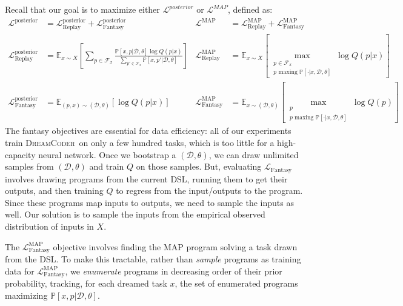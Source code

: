 \documentclass{article}
\newcommand{\system}{\textsc{DreamCoder}~}
\newcommand{\expect}{\mathds{E}} %
\newcommand{\probability}{\mathds{P}} %
\begin{document}
Recall that our goal is to maximize either $\mathcal{L}^{posterior}$ or $\mathcal{L}^{MAP}$, defined as:
\begin{align*}
  \mathcal{L}^{\text{posterior}} &= \mathcal{L}_{\text{Replay}}^{\text{posterior}} + \mathcal{L}_{\text{Fantasy}}^{\text{posterior}}&
  \mathcal{L}^{\text{MAP}} &= \mathcal{L}_{\text{Replay}}^{\text{MAP}} + \mathcal{L}_{\text{Fantasy}}^{\text{MAP}}\\
  \mathcal{L}_{\text{Replay}}^{\text{posterior}}& = \expect_{x\sim X}\left[\sum_{p\in \mathcal{F}_x}
    \frac{\probability\left[x,p|\mathcal{D},\theta \right]\log Q(p|x)}{\sum_{p'\in \mathcal{F}_x}\probability\left[x,p'|\mathcal{D},\theta \right]}\right] &
\mathcal{L}_{\text{Replay}}^{\text{MAP}}& = \expect_{x\sim X}\left[\max_{\substack{p\in \mathcal{F}_x\\p\text{ maxing }\probability[\cdot |x,\mathcal{D},\theta]}} \log Q(p|x) \right]  \\
  \mathcal{L}_{\text{Fantasy}}^{\text{posterior}} &= \expect_{(p,x)\sim(\mathcal{D},\theta) }\left[\log Q(p|x)\right]&
    \mathcal{L}_{\text{Fantasy}}^{\text{MAP}} &= \expect_{x\sim(\mathcal{D},\theta) }\left[\max_{\substack{p\\p\text{ maxing }\probability[\cdot |x,\mathcal{D},\theta]}}\log Q(p)\right]
\end{align*}
The fantasy objectives are essential for data efficiency:
all of our experiments train \system on only a few hundred tasks, which is too little for
a high-capacity neural network.
Once we bootstrap a $(\mathcal{D},\theta)$,
we can draw unlimited samples from $(\mathcal{D},\theta)$
and train $Q$ on those samples.
But, evaluating $\mathcal{L}_{\text{Fantasy}}$ involves drawing programs from
the current DSL, running them to get their outputs,
and then training $Q$ to regress from the input/outputs to the program.
Since these programs map inputs to outputs,
we need to sample the inputs as well.
Our solution is to sample the inputs
from the empirical observed distribution of inputs in $X$.

The $\mathcal{L}_{\text{Fantasy}}^{\text{MAP}}$ objective involves
finding the MAP program solving a task drawn from the DSL.  To make
this tractable, rather than \emph{sample} programs as training data
for $\mathcal{L}_{\text{Fantasy}}^{\text{MAP}}$, we \emph{enumerate}
programs in decreasing order of their prior probability, tracking, for
each dreamed task $x$, the set of enumerated programs maximizing
$\probability[x,p|\mathcal{D},\theta]$.
\end{document}
